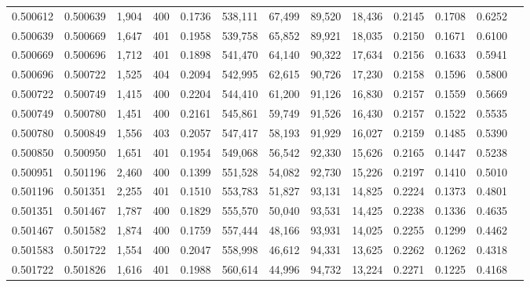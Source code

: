 \begin{tabular}{rrrrrrrrrrrrr}
0.500612 & 0.500639 & 1,904 & 400 &                                     0.1736 & 538,111 &  67,499 &  89,520 &  18,436 & 0.2145 & 0.1708 & 0.6252 \\
0.500639 & 0.500669 & 1,647 & 401 &                                     0.1958 & 539,758 &  65,852 &  89,921 &  18,035 & 0.2150 & 0.1671 & 0.6100 \\
0.500669 & 0.500696 & 1,712 & 401 &                                     0.1898 & 541,470 &  64,140 &  90,322 &  17,634 & 0.2156 & 0.1633 & 0.5941 \\
0.500696 & 0.500722 & 1,525 & 404 &                                     0.2094 & 542,995 &  62,615 &  90,726 &  17,230 & 0.2158 & 0.1596 & 0.5800 \\
0.500722 & 0.500749 & 1,415 & 400 &                                     0.2204 & 544,410 &  61,200 &  91,126 &  16,830 & 0.2157 & 0.1559 & 0.5669 \\
0.500749 & 0.500780 & 1,451 & 400 &                                     0.2161 & 545,861 &  59,749 &  91,526 &  16,430 & 0.2157 & 0.1522 & 0.5535 \\
0.500780 & 0.500849 & 1,556 & 403 &                                     0.2057 & 547,417 &  58,193 &  91,929 &  16,027 & 0.2159 & 0.1485 & 0.5390 \\
0.500850 & 0.500950 & 1,651 & 401 &                                     0.1954 & 549,068 &  56,542 &  92,330 &  15,626 & 0.2165 & 0.1447 & 0.5238 \\
0.500951 & 0.501196 & 2,460 & 400 &                                     0.1399 & 551,528 &  54,082 &  92,730 &  15,226 & 0.2197 & 0.1410 & 0.5010 \\
0.501196 & 0.501351 & 2,255 & 401 &                                     0.1510 & 553,783 &  51,827 &  93,131 &  14,825 & 0.2224 & 0.1373 & 0.4801 \\
0.501351 & 0.501467 & 1,787 & 400 &                                     0.1829 & 555,570 &  50,040 &  93,531 &  14,425 & 0.2238 & 0.1336 & 0.4635 \\
0.501467 & 0.501582 & 1,874 & 400 &                                     0.1759 & 557,444 &  48,166 &  93,931 &  14,025 & 0.2255 & 0.1299 & 0.4462 \\
0.501583 & 0.501722 & 1,554 & 400 &                                     0.2047 & 558,998 &  46,612 &  94,331 &  13,625 & 0.2262 & 0.1262 & 0.4318 \\
0.501722 & 0.501826 & 1,616 & 401 &                                     0.1988 & 560,614 &  44,996 &  94,732 &  13,224 & 0.2271 & 0.1225 & 0.4168 \\

\end{tabular}
